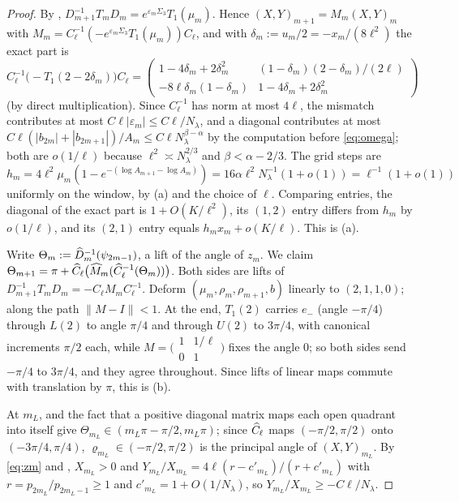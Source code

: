 \begin{proof}
 By , $D_{m+1}^{-1}T_mD_m=e^{\varepsilon_m\Sigma_3}T_1(\mu_m)$.
Hence $(X,Y)_{m+1}=M_m(X,Y)_m$ with $M_m=C_\ell^{-1}(-e^{\varepsilon_m\Sigma_3}T_1(\mu_m))C_\ell$,
and with $\delta_m:=u_m/2=-x_m/(8\ell^2)$ the exact part is
\[
  C_\ell^{-1}\bigl(-T_1(2-2\delta_m)\bigr)C_\ell=
  \begin{pmatrix}1-4\delta_m+2\delta_m^2&(1-\delta_m)(2-\delta_m)/(2\ell)\\
  -8\ell\delta_m(1-\delta_m)&1-4\delta_m+2\delta_m^2\end{pmatrix}
\]
(by direct multiplication). Since $C_\ell^{-1}$ has norm at most $4\ell$, the mismatch contributes at
most $C\ell|\varepsilon_m|\le C\ell/N_\lambda$, and a diagonal contributes at most
$C\ell(|b_{2m}|+|b_{2m+1}|)/A_m\le C\ell N_\lambda^{\beta-\alpha}$ by the computation before
\eqref{eq:omega}; both are $o(1/\ell)$ because $\ell^2\asymp N_\lambda^{2/3}$ and $\beta<\alpha-2/3$.
The grid steps are $h_m=4\ell^2\mu_m(1-e^{-(\log A_{m+1}-\log A_m)})=16\alpha\ell^2N_\lambda^{-1}(1+o(1))
=\ell^{-1}(1+o(1))$ uniformly on the window, by (a) and the choice of $\ell$.
Comparing entries, the diagonal of the exact part is $1+O(K/\ell^2)$, its $(1,2)$ entry
differs from $h_m$ by $o(1/\ell)$, and its $(2,1)$ entry equals $h_mx_m+o(K/\ell)$. This is (a).

 Write $\Theta_m:=\widehat D_m^{-1}(\psi_{2m-1})$, a lift of the angle of $z_m$. We
claim $\Theta_{m+1}=\pi+\widehat C_\ell\bigl(\widehat M_m(\widehat C_\ell^{-1}(\Theta_m))\bigr)$. Both sides are lifts
of $D_{m+1}^{-1}T_mD_m=-C_\ell M_mC_\ell^{-1}$. Deform $(\mu_m,\rho_m,\rho_{m+1},b)$ linearly to
$(2,1,1,0)$; along the path $\|M-I\|<1$. At the end, $T_1(2)$ carries $e_-$ (angle $-\pi/4$)
through $L(2)$ to angle $\pi/4$ and through $U(2)$ to $3\pi/4$, with canonical increments
$\pi/2$ each, while $M=\bigl(\begin{smallmatrix}1&1/\ell\\0&1\end{smallmatrix}\bigr)$ fixes the
angle $0$; so both sides send $-\pi/4$ to $3\pi/4$, and they agree throughout. Since lifts
of linear maps commute with translation by $\pi$, this is (b).

 At $m_L$,  and the fact that a positive diagonal
matrix maps each open quadrant into itself give $\Theta_{m_L}\in(m_L\pi-\pi/2,m_L\pi)$; since
$\widehat C_\ell$ maps $(-\pi/2,\pi/2)$ onto $(-3\pi/4,\pi/4)$, $\varrho_{m_L}\in(-\pi/2,\pi/2)$ is
the principal angle of $(X,Y)_{m_L}$. By \eqref{eq:zm} and ,
$X_{m_L}>0$ and $Y_{m_L}/X_{m_L}=4\ell(r-c'_{m_L})/(r+c'_{m_L})$ with
$r=p_{2m_L}/p_{2m_L-1}\ge1$ and $c'_{m_L}=1+O(1/N_\lambda)$, so
$Y_{m_L}/X_{m_L}\ge-C\ell/N_\lambda$.
\end{proof}

